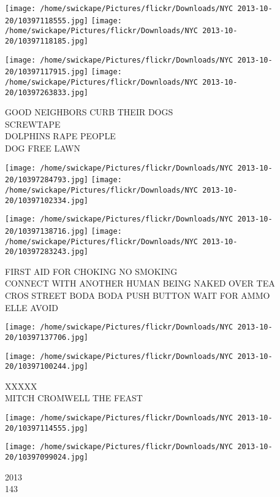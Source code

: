 \documentclass[10pt,letterpaper]{article}
\begin{document}
\texttt{[image: /home/swickape/Pictures/flickr/Downloads/NYC 2013-10-20/10397118555.jpg]}
\texttt{[image: /home/swickape/Pictures/flickr/Downloads/NYC 2013-10-20/10397118185.jpg]}

\texttt{[image: /home/swickape/Pictures/flickr/Downloads/NYC 2013-10-20/10397117915.jpg]}
\texttt{[image: /home/swickape/Pictures/flickr/Downloads/NYC 2013-10-20/10397263833.jpg]}

GOOD NEIGHBORS CURB THEIR DOGS\\
SCREWTAPE\\
DOLPHINS RAPE PEOPLE\\
DOG FREE LAWN\\
\pagebreak

\texttt{[image: /home/swickape/Pictures/flickr/Downloads/NYC 2013-10-20/10397284793.jpg]}
\texttt{[image: /home/swickape/Pictures/flickr/Downloads/NYC 2013-10-20/10397102334.jpg]}

\texttt{[image: /home/swickape/Pictures/flickr/Downloads/NYC 2013-10-20/10397138716.jpg]}
\texttt{[image: /home/swickape/Pictures/flickr/Downloads/NYC 2013-10-20/10397283243.jpg]}

FIRST AID FOR CHOKING NO SMOKING\\
CONNECT WITH ANOTHER HUMAN BEING NAKED OVER TEA\\
CROS STREET BODA BODA PUSH BUTTON WAIT FOR AMMO\\
ELLE AVOID\\
\pagebreak

\texttt{[image: /home/swickape/Pictures/flickr/Downloads/NYC 2013-10-20/10397137706.jpg]}

\vspace{0.25in}
\texttt{[image: /home/swickape/Pictures/flickr/Downloads/NYC 2013-10-20/10397100244.jpg]}

XXXXX\\
MITCH CROMWELL THE FEAST\\
\pagebreak

\texttt{[image: /home/swickape/Pictures/flickr/Downloads/NYC 2013-10-20/10397114555.jpg]}

\vspace{0.25in}
\texttt{[image: /home/swickape/Pictures/flickr/Downloads/NYC 2013-10-20/10397099024.jpg]}

2013\\
143\\
\pagebreak
\end{document}
